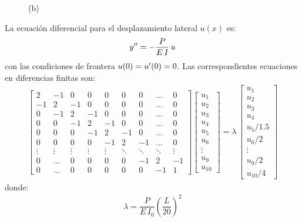 \begin{enumerate}
\begin{figure}[H]
\begin{tikzpicture}
\end{tikzpicture}
\caption{(b)}
\label{fig:figura_b}
\end{figure}
La ecuación diferencial para el desplazamiento lateral $u (x)$ es:
\begin{align*}
\sderivada{y} = - \dfrac{P}{E \, I} \, u
\end{align*}
con las condiciones de frontera $u (0) = \pderivada{u} (0) = 0$. Las correspondientes ecuaciones en diferencias finitas son:
\begin{align*}
\begin{bmatrix}
2 & -1 & 0 & 0 & 0 & 0 & 0 & \ldots & 0 \\
- 1 & 2 & -1 & 0 & 0 & 0 & 0 & \ldots & 0 \\
0 & - 1 & 2 & -1 & 0 & 0 & 0 & \ldots & 0 \\
0 & 0 & - 1 & 2 & -1 & 0 & 0 & \ldots & 0 \\
0 & 0 & 0 & - 1 & 2 & -1 & 0 & \ldots & 0 \\
0 & 0 & 0 & 0 & - 1 & 2 & -1 & \ldots & 0 \\
\vdots & \vdots & \vdots & \vdots & \vdots & \ddots & \ddots & \ddots & \vdots \\
0 & \ldots & 0 & 0 & 0 &  0 & - 1 & 2 & -1 \\
0 & \ldots & 0 & 0 & 0 &  0 & 0 & -1 & 1
\end{bmatrix}
\begin{bmatrix}
u_{1} \\
u_{2} \\
u_{3} \\
u_{4} \\
u_{5} \\
u_{6} \\
\vdots \\
u_{9} \\
u_{10}
\end{bmatrix}
= \lambda \, 
\begin{bmatrix}
u_{1} \\
u_{2} \\
u_{3} \\
u_{4} \\
u_{5}/1.5 \\
u_{6}/2 \\
\vdots \\
u_{9}/2 \\
u_{10}/4
\end{bmatrix}
\end{align*}
donde:
\begin{align*}
\lambda = \dfrac{P}{E \, I_{0}} \left( \dfrac{L}{20} \right)^{2}

\end{align*}
\end{enumerate}
